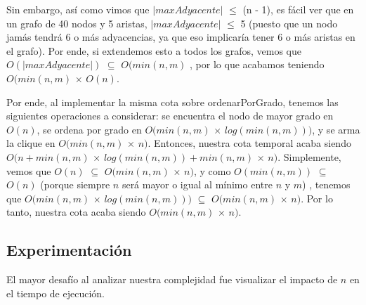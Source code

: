 Sin embargo, así como vimos que $|maxAdyacente|$ $\leq$ (n - 1), es fácil ver que en un grafo de 40 nodos y 5 aristas, $|maxAdyacente|$ $\leq$ 5 (puesto que un nodo jamás tendrá 6 o más adyacencias, ya que eso implicaría tener 6 o más aristas en el grafo). Por ende, si extendemos esto a todos los grafos, vemos que $O(|maxAdyacente|)$ $\subseteq$ $O(min(n,m)$ , por lo que acabamos teniendo $O(min(n,m)$ $\times$ $O(n)$.

Por ende, al implementar la misma cota sobre ordenarPorGrado, tenemos las siguientes operaciones a considerar: se encuentra el nodo de mayor grado en $O(n)$, se ordena por grado en $O(min(n,m)$ $\times$ $log(min(n,m)))$, y se arma la clique en $O(min(n,m)$ $\times$ $n )$.  Entonces, nuestra cota temporal acaba siendo $O(n + min(n,m)$ $\times$ $log(min(n,m)) + min(n,m)$ $\times$ $n )$. Simplemente, vemos que $O(n)$ $\subseteq$ $O(min(n,m)$ $\times$ $n )$, y como $O(min(n,m))$ $\subseteq$ $O(n)$ (porque siempre $n$ será mayor o igual al mínimo entre $n$ y $m$) , tenemos que $O(min(n,m)$ $\times$ $log(min(n,m)))$ $\subseteq$ $O(min(n,m)$ $\times$ $n )$. Por lo tanto, nuestra cota acaba siendo $O(min(n,m)$ $\times$ $n )$.


\subsection{Experimentación}

El mayor desafío al analizar nuestra complejidad fue visualizar el impacto de $n$ en el tiempo de ejecución.

